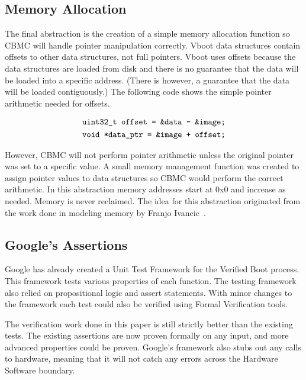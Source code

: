\subsection{Memory Allocation}

The final abstraction is the creation of a simple memory allocation function so
CBMC will handle pointer manipulation correctly.
Vboot data structures contain offsets to other data structures, not full
pointers. 
Vboot uses offsets because the data structures are loaded from disk and there is
no guarantee that the data will be loaded into a specific address.
(There is however, a guarantee that the data will be loaded contiguously.)
The following code shows the simple pointer arithmetic needed for offsets.

\begin{equation} \label{eq:ptr}
\begin{split}
    \texttt{uint32\_t offset = \&data - \&image;} \\
    \texttt{void *data\_ptr = \&image + offset;} 
\end{split}
\end{equation}

However, CBMC will not perform pointer arithmetic unless the original pointer
was set to a specific value.
A small memory management function was created to assign pointer values to data
structures so CBMC would perform the correct arithmetic.
In this abstraction memory addresses start at 0x0 and increase as needed.
Memory is never reclaimed.
The idea for this abstraction originated from the work done in modeling memory
by Franjo Ivancic~\cite{eff-model-check}.

\subsection{Google's Assertions}

Google has already created a Unit Test Framework for the Verified Boot process.
This framework tests various properties of each function.
The testing framework also relied on propositional logic and assert statements.
With minor changes to the framework each test could also be verified using Formal Verification tools.

The verification work done in this paper is still strictly better than the existing tests. 
The existing assertions are now proven formally on any input, and more advanced properties could be proven. 
Google's framework also stubs out any calls to hardware, meaning that it 
will not catch any errors across the Hardware Software boundary.

